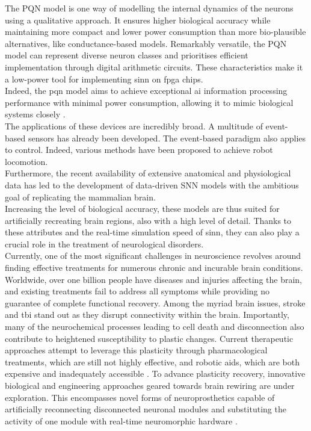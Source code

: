 The PQN model \cite{Nanami} is one way of modelling the internal dynamics 
of the neurons using a qualitative approach. It ensures higher biological 
accuracy while maintaining more compact and lower power consumption than 
more bio-plausible alternatives, like conductance-based models. Remarkably 
versatile, the PQN model can represent diverse neuron classes and 
prioritises efficient implementation through digital arithmetic circuits. 
These characteristics make it a low-power tool for implementing \acrshort{sinn} on \acrshort{fpga} chips.\\
Indeed, the \acrshort{pqn} model aims to achieve exceptional \acrshort{ai} information processing performance with minimal power consumption, 
allowing it to mimic biological systems closely \cite{Levi2018}.\\

The applications of these devices are incredibly broad. A multitude of 
event-based sensors has already been developed. The event-based paradigm 
also applies to control. Indeed, various methods have been proposed to 
achieve robot locomotion.\\
Furthermore, the recent availability of extensive anatomical and 
physiological data has led to the development of data-driven SNN models 
\cite{Bezaire} 
with the ambitious goal of replicating the mammalian brain.\\
Increasing the level of biological accuracy, these models are thus suited 
for artificially recreating brain regions, also with a high level of detail.
Thanks to these attributes and the real-time simulation speed of \acrshort{sinn}, 
they can also play a crucial role in the treatment of neurological 
disorders.\\

Currently, one of the most significant challenges in neuroscience revolves around finding effective treatments for numerous chronic and incurable brain conditions. Worldwide, over one billion people have diseases and injuries affecting the brain, and existing treatments fail to address all symptoms while providing no guarantee of complete functional recovery. Among the myriad brain issues, stroke and \acrfull{tbi} stand out as they disrupt connectivity within the brain. Importantly, many of the neurochemical processes leading to cell death and disconnection also contribute to heightened susceptibility to plastic changes. Current therapeutic approaches attempt to leverage this plasticity through pharmacological treatments, which are still not highly effective, and robotic aids, which are both expensive and inadequately accessible \cite{Chiappalone}.
To advance plasticity recovery, innovative biological and engineering approaches geared towards brain rewiring are under exploration. This encompasses novel forms of neuroprosthetics \cite{GEORGE} capable of artificially reconnecting disconnected neuronal modules and substituting the activity of one module with real-time neuromorphic hardware \cite{Ambroise,BUCCELLI}.\\

